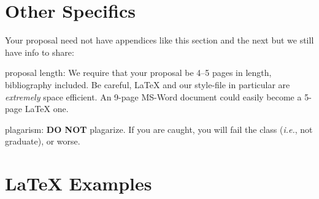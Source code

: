 \documentclass{sig-alternate}
\begin{document}

\vspace{175pt}

\appendix
\section{Other Specifics}
\label{app:other_specifics}
Your proposal need not have appendices like this section and the next
but we still have info to share:


\begin{enumerate*}
\item {\sc proposal length}: We require that your proposal be 4--5
  pages in length, bibliography included. Be careful, \LaTeX{} and our
  style-file in particular are \textit{extremely} space efficient. An
  9-page MS-Word document could easily become a 5-page \LaTeX{}
  one.\vspace{5pt}

\item {\sc plagarism}: \textbf{DO NOT} plagarize. If you are caught,
  you will fail the class (\textit{i.e.}, not graduate), or worse.

\end{enumerate*}

\section{\LaTeX{} Examples}
\label{app:latex_examples}
\end{document}
